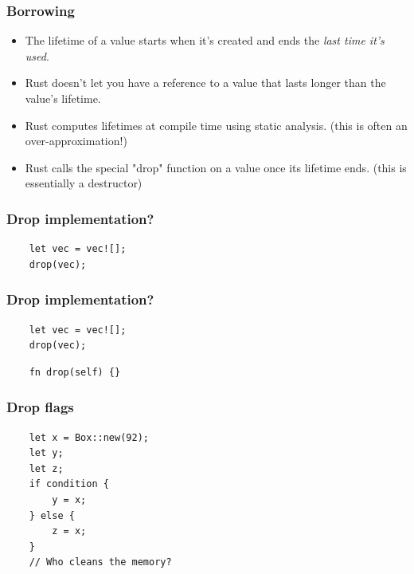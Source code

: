 \documentclass[aspectratio=1610,t]{beamer}
\begin{document}

\begin{frame}[fragile]
\frametitle{Borrowing}
\begin{itemize}
    \item The lifetime of a value starts when it’s created and ends the \textit{last time it’s used}.
    \item Rust doesn’t let you have a reference to a value that lasts longer than the value’s lifetime.
    \item Rust computes lifetimes at compile time using static analysis. (this is often an over-approximation!)
    \item Rust calls the special "drop" function on a value once its lifetime ends. (this is essentially a destructor)
\end{itemize}
\end{frame}


\begin{frame}[fragile]
\frametitle{Drop implementation?}
\begin{verbatim}
    let vec = vec![];
    drop(vec);
\end{verbatim}
\end{frame}


\begin{frame}[fragile]
\frametitle{Drop implementation?}
\begin{verbatim}
    let vec = vec![];
    drop(vec);
\end{verbatim}

\begin{verbatim}
    fn drop(self) {}
\end{verbatim}
\end{frame}


\begin{frame}[fragile]
\frametitle{Drop flags}
\begin{verbatim}
    let x = Box::new(92);
    let y;
    let z;
    if condition {
        y = x;
    } else {
        z = x;
    }
    // Who cleans the memory?
\end{verbatim}
\end{frame}
\end{document}
